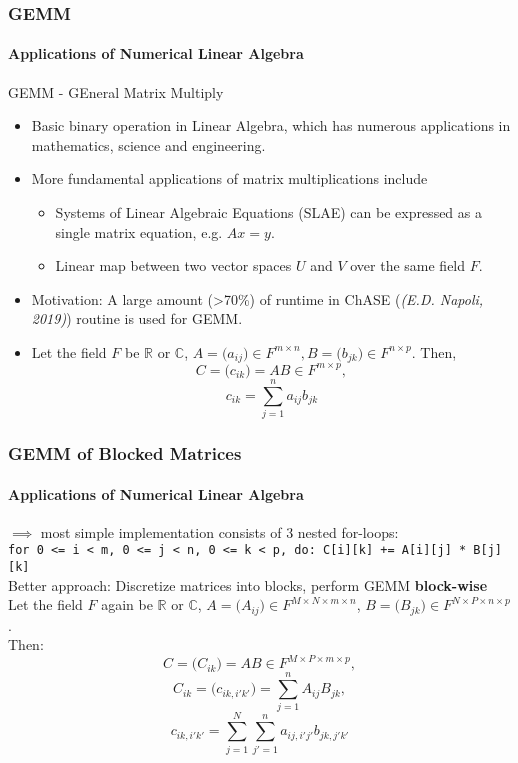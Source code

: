 \begin{frame}
\frametitle{GEMM}
\framesubtitle{Applications of Numerical Linear Algebra}
GEMM - GEneral Matrix Multiply
\begin{itemize}
 \item Basic binary operation in Linear Algebra, which has numerous applications in mathematics, science and engineering.
 \item More fundamental applications of matrix multiplications include
  \begin{itemize}
   \item Systems of Linear Algebraic Equations (SLAE) can be expressed as a single matrix equation, e.g. \(Ax = y\). 
   \item Linear map between two vector spaces \(U\) and \(V\) over the same field \(F\).
  \end{itemize}
 \item Motivation: A large amount (>70\%) of runtime in ChASE (\emph{(E.D. Napoli, 2019)}) routine is used for GEMM.
 \item Let the field \(F\) be \(\mathbb{R}\) or \(\mathbb{C}\), \(A =\big( a_{ij} \big) \in F^{m \times n}, B =\big( b_{jk} \big) \in F^{n \times p}\). Then,
 \begin{equation}
  C=\big( c_{ik} \big)=AB \in F^{m \times p},
 \end{equation}
 \begin{equation}
  c_{ik} = \sum_{j=1}^n{a_{ij}b_{jk}}
 \end{equation}
\end{itemize}
\end{frame}

\begin{frame}
\frametitle{GEMM of Blocked Matrices}
\framesubtitle{Applications of Numerical Linear Algebra}
\(\implies\) most simple implementation consists of 3 nested for-loops: \\
\vspace{0.005cm}\texttt{for 0 <= i < m, 0 <= j < n, 0 <= k < p, do: C[i][k] += A[i][j] * B[j][k]}\\
\vspace{0.25cm}Better approach: Discretize matrices into blocks, perform GEMM \textbf{block-wise}\\
\vspace{0.005cm}Let the field \(F\) again be \(\mathbb{R}\) or \(\mathbb{C}\),
\(A =\big( A_{ij} \big) \in F^{M \times N \times m \times n}\),
\(B =\big( B_{jk} \big) \in F^{N \times P \times n \times p}\).\\
\vspace{0.005cm}Then:
\begin{equation}
 C=\big( C_{ik} \big)=AB \in F^{M \times P \times m \times p},
\end{equation}
\begin{equation}
 C_{ik} = \big( c_{ik,i'k'} \big) = \sum_{j=1}^n{A_{ij}B_{jk}},
\end{equation}
\begin{equation}
 c_{ik,i'k'} = \sum_{j=1}^N{\sum_{j'=1}^n{a_{ij,i'j'}b_{jk,j'k'}}}
\end{equation}
\end{frame}

